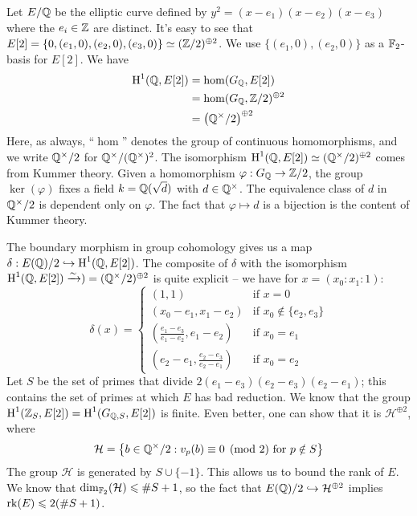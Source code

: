 \documentclass{article}
\begin{document}
\begin{example}[descent]
Let $E/\mathbb{Q}$ be the elliptic curve defined by $y^2=(x-e_1)(x-e_2)(x-e_3)$ where 
the $e_i\in \mathbb{Z}$ are distinct. It's easy to see that 
$E[2]=\{0,(e_1,0),(e_2,0),(e_3,0)\}\simeq (\mathbb{Z}/2)^{\oplus 2}$. We use 
$\{(e_1,0),(e_2,0)\}$ as a $\mathbb{F}_2$-basis for $E[2]$. We have 
\begin{align*}
  \operatorname{H}^1(\mathbb{Q},E[2]) &= \hom(G_{\mathbb{Q}},E[2]) \\
    &= \hom(G_{\mathbb{Q}},\mathbb{Z}/2)^{\oplus 2} \\
    &= \left(\mathbb{Q}^\times/2\right)^{\oplus 2}
\end{align*}
Here, as always, ``$\hom$'' denotes the group of continuous homomorphisms, and 
we write $\mathbb{Q}^\times/2$ for $\mathbb{Q}^\times/(\mathbb{Q}^\times)^2$. The isomorphism 
$\operatorname{H}^1(\mathbb{Q},E[2])\simeq (\mathbb{Q}^\times/2)^{\oplus 2}$ comes from Kummer theory. 
Given a homomorphism $\varphi:G_{\mathbb{Q}}\to \mathbb{Z}/2$, the group $\ker(\varphi)$ 
fixes a field $k=\mathbb{Q}(\sqrt d)$ with $d\in \mathbb{Q}^\times$. The equivalence class of 
$d$ in $\mathbb{Q}^\times/2$ is dependent only on $\varphi$. The fact that 
$\varphi\mapsto d$ is a bijection is the content of Kummer theory. 

The boundary morphism in group cohomology gives us a map 
$\delta:E(\mathbb{Q})/2 \hookrightarrow \operatorname{H}^1(\mathbb{Q},E[2])$. The 
composite of $\delta$ with the isomorphism 
$\operatorname{H}^1(\mathbb{Q},E[2])\xrightarrow\sim )=(\mathbb{Q}^\times/2)^{\oplus 2}$ is quite explicit 
-- we have for $x=(x_0:x_1:1)$:
\[
  \delta(x) 
    = \begin{cases}
        (1,1)             & \text{if $x=0$} \\
        (x_0-e_1,x_1-e_2) & \text{if $x_0\notin \{e_2,e_3\}$} \\
        \left(\frac{e_1-e_3}{e_1-e_2},e_1-e_2\right) & \text{if $x_0=e_1$} \\
        \left(e_2-e_1,\frac{e_2-e_3}{e_2-e_1}\right) & \text{if $x_0=e_2$}
      \end{cases}
\]
Let $S$ be the set of primes that divide $2(e_1-e_3)(e_2-e_3)(e_2-e_1)$; this 
contains the set of primes at which $E$ has bad reduction. We know that the 
group $\operatorname{H}^1(\mathbb{Z}_S,E[2]) = \operatorname{H}^1(G_{\mathbb{Q},S},E[2])$ is finite. Even better, one can 
show that it is $\mathcal H^{\oplus 2}$, where 
\[
  \mathcal H = \left\{b\in \mathbb{Q}^\times/2 : \text{$v_p(b)\equiv 0\pmod 2$ for $p\notin S$}\right\}
\]
The group $\mathcal H$ is generated by $S\cup\{-1\}$. This allows us to bound 
the rank of $E$. We know that $\dim_{\mathbb{F}_2}(\mathcal H)\leqslant \# S+1$, so 
the fact that $E(\mathbb{Q})/2\hookrightarrow \mathcal H^{\oplus 2}$ implies 
$\operatorname{rk}(E) \leqslant 2(\# S+1)$. 


\end{example}
\end{document}
